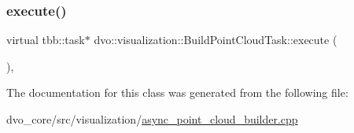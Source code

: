 \subsubsection{\texorpdfstring{execute()}{execute()}}
{\footnotesize\ttfamily virtual tbb\+::task$\ast$ dvo\+::visualization\+::\+Build\+Point\+Cloud\+Task\+::execute (\begin{DoxyParamCaption}{ }\end{DoxyParamCaption})\hspace{0.3cm}{\ttfamily [inline]}, {\ttfamily [virtual]}}



The documentation for this class was generated from the following file\+:\begin{DoxyCompactItemize}
\item 
dvo\+\_\+core/src/visualization/\mbox{\hyperlink{async__point__cloud__builder_8cpp}{async\+\_\+point\+\_\+cloud\+\_\+builder.\+cpp}}\end{DoxyCompactItemize}
